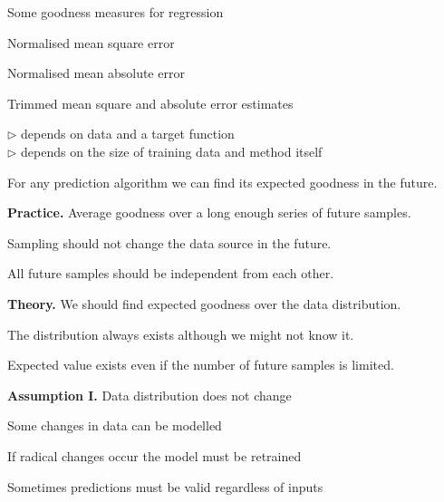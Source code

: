 \documentclass[landscape,footrule]{foils}
\begin{document}
Some goodness measures for regression
\begin{triangles}
\item Normalised mean square error
\item Normalised mean absolute error
\item Trimmed mean square and absolute error estimates  
\end{triangles}

\foilhead[-1cm]{}



\enlargethispage{1cm}
\vspace*{-0.0cm}
$\triangleright$  depends on data and a target function\\
$\triangleright$  depends on the size of training data and method itself


\foilhead[-1cm]{}


\enlargethispage{1cm}

For any prediction algorithm we can find its expected goodness in the future.

\textbf{Practice.} Average goodness over a long enough series of future samples.

\begin{triangles}
\item Sampling should not change the data source in the future. 
\item All future samples should be independent from each other. 
\end{triangles} 
\vspace*{2ex}

\textbf{Theory.} We should find expected goodness over the data distribution.
\begin{triangles}
\item The distribution always exists although we might not know it.  
\item Expected value exists even if the number of future samples is limited.
\end{triangles} 
\bigskip

\foilhead[-1cm]{}



\textbf{Assumption I.} Data distribution does not change
\begin{triangles}
\item Some changes in data can be modelled
\item If radical changes occur the model must be retrained
\item Sometimes predictions must be valid regardless of inputs  \vspace*{1cm}
\end{triangles}
\end{document}
